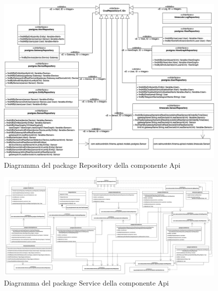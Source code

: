		\begin{landscape}
		\begin{figure}[H]
			\centering
			\includegraphics[scale=0.550]{res/images/API/RepositoryPackage.png}
			\caption{Diagramma del package Repository della componente Api}
		\end{figure}
		\begin{figure}[H]
			\centering
			\includegraphics[scale=0.300]{res/images/API/ServicePackage.png}
			\caption{Diagramma del package Service della componente Api}
		\end{figure}
		\end{landscape}


